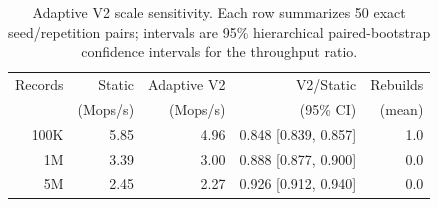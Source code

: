 \begin{table}[t]
  \centering
  \caption{Adaptive V2 scale sensitivity.  Each row summarizes 50 exact
  seed/repetition pairs; intervals are 95\% hierarchical paired-bootstrap
  confidence intervals for the throughput ratio.}
  \label{tab:adaptive-scale}
  \small
  \begin{tabular}{rrrrr}
    \toprule
    Records & Static & Adaptive V2 & V2/Static & Rebuilds \\
            & (Mops/s) & (Mops/s) & (95\% CI) & (mean) \\
    \midrule
    100K & 5.85 & 4.96 & 0.848 [0.839, 0.857] & 1.0 \\
    1M   & 3.39 & 3.00 & 0.888 [0.877, 0.900] & 0.0 \\
    5M   & 2.45 & 2.27 & 0.926 [0.912, 0.940] & 0.0 \\
    \bottomrule
  \end{tabular}
\end{table}
